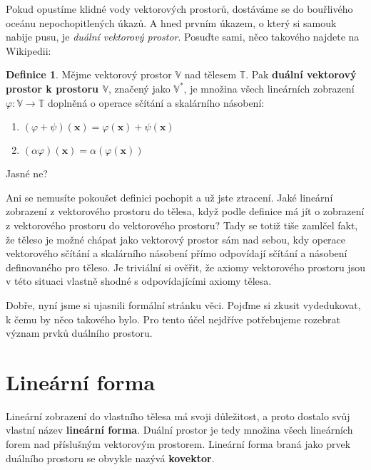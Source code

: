 \documentclass[a5paper,12pt]{amsbook}
\theoremstyle{definition}
\newtheorem{definition}{Definice}[chapter]
\newcommand{\myscalar}[1]{#1}
\newcommand{\myvec}[1]{\bm{#1}}
\newcommand{\myspace}[1]{\mathbb{#1}}
\newcommand{\mymap}[1]{#1}
\newcommand{\mydual}[1]{\myspace{#1^{*}}}
\begin{document}
\noindent Pokud opustíme klidné vody vektorových prostorů, dostáváme se do bouřlivého oceánu
nepochopitlených úkazů. A hned prvním úkazem, o který si samouk nabije pusu, je \textit{duální
vektorový prostor}. Posuďte sami, něco takového najdete na Wikipedii:

\begin{definition}
Mějme vektorový prostor $\myspace{V}$ nad tělesem $\myspace{T}$. Pak \textbf{duální vektorový
prostor k prostoru $\myspace{V}$}, značený jako $\mydual{V}$, je množina všech lineárních
zobrazení $\mymap{\varphi}: \myspace{V}\rightarrow\myspace{T}$ doplněná o operace sčítání
a skalárního násobení:

\begin{enumerate}
  \item $(\mymap{\varphi} + \mymap{\psi})(\myvec{x}) = \mymap{\varphi}(\myvec{x}) + \mymap{\psi}(\myvec{x})$
  \item $(\myscalar{\alpha}\mymap{\varphi})(\myvec{x}) = \myscalar{\alpha}(\mymap{\varphi}(\myvec{x}))$
\end{enumerate}

\end{definition}

\noindent Jasné ne?

Ani se nemusíte pokoušet definici pochopit a už jste ztracení. Jaké lineární zobrazení z vektorového
prostoru do tělesa, když podle definice má jít o zobrazení z vektorového prostoru do vektorového
prostoru? Tady se totiž tiše zamlčel fakt, že těleso je možné chápat jako vektorový prostor sám
nad sebou, kdy operace vektorového sčítání a skalárního násobení přímo odpovídají sčítání a násobení
definovaného pro těleso. Je triviální si ověřit, že axiomy vektorového prostoru jsou v této situaci
vlastně shodné s odpovídajícími axiomy tělesa.

Dobře, nyní jsme si ujasnili formální stránku věci. Pojďme si zkusit vydedukovat, k čemu by něco
takového bylo. Pro tento účel nejdříve potřebujeme rozebrat význam prvků duálního prostoru.

\section{Lineární forma}

\noindent Lineární zobrazení do vlastního tělesa má svoji důležitost, a proto dostalo svůj vlastní
název \textbf{lineární forma}. Duální prostor je tedy množina všech lineárních forem nad příslušným
vektorovým prostorem. Lineární forma braná jako prvek duálního prostoru se obvykle nazývá 
\textbf{kovektor}.
\end{document}
